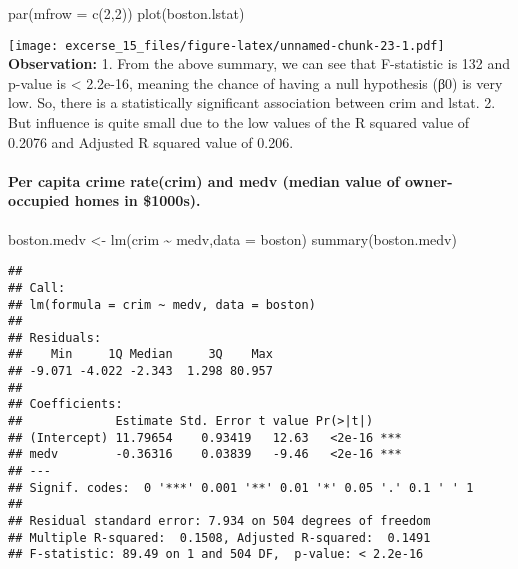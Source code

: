 \documentclass[
]{article}
\newenvironment{Shaded}{\begin{snugshade}}{\end{snugshade}}
\newcommand{\AttributeTok}[1]{\textcolor[rgb]{0.77,0.63,0.00}{#1}}
\newcommand{\DecValTok}[1]{\textcolor[rgb]{0.00,0.00,0.81}{#1}}
\newcommand{\FunctionTok}[1]{\textcolor[rgb]{0.00,0.00,0.00}{#1}}
\newcommand{\NormalTok}[1]{#1}
\newcommand{\OtherTok}[1]{\textcolor[rgb]{0.56,0.35,0.01}{#1}}
\newcommand{\SpecialCharTok}[1]{\textcolor[rgb]{0.00,0.00,0.00}{#1}}
\begin{document}
\begin{Shaded}
\begin{Highlighting}[]
\FunctionTok{par}\NormalTok{(}\AttributeTok{mfrow =} \FunctionTok{c}\NormalTok{(}\DecValTok{2}\NormalTok{,}\DecValTok{2}\NormalTok{))}
\FunctionTok{plot}\NormalTok{(boston.lstat)}
\end{Highlighting}
\end{Shaded}

\texttt{[image: excerse\_15\_files/figure-latex/unnamed-chunk-23-1.pdf]}
\textbf{Observation:} 1. From the above summary, we can see that
F-statistic is 132 and p-value is \textless{} 2.2e-16, meaning the
chance of having a null hypothesis (β0) is very low. So, there is a
statistically significant association between crim and lstat. 2. But
influence is quite small due to the low values of the R squared value of
0.2076 and Adjusted R squared value of 0.206.

\hypertarget{per-capita-crime-ratecrim-and-medv-median-value-of-owner-occupied-homes-in-1000s.}{%
\paragraph{Per capita crime rate(crim) and medv (median value of
owner-occupied homes in
\$1000s).}\label{per-capita-crime-ratecrim-and-medv-median-value-of-owner-occupied-homes-in-1000s.}}

\begin{Shaded}
\begin{Highlighting}[]
\NormalTok{boston.medv }\OtherTok{\textless{}{-}} \FunctionTok{lm}\NormalTok{(crim }\SpecialCharTok{\textasciitilde{}}\NormalTok{ medv,}\AttributeTok{data =}\NormalTok{ boston)}
\FunctionTok{summary}\NormalTok{(boston.medv)}
\end{Highlighting}
\end{Shaded}

\begin{verbatim}
## 
## Call:
## lm(formula = crim ~ medv, data = boston)
## 
## Residuals:
##    Min     1Q Median     3Q    Max 
## -9.071 -4.022 -2.343  1.298 80.957 
## 
## Coefficients:
##             Estimate Std. Error t value Pr(>|t|)    
## (Intercept) 11.79654    0.93419   12.63   <2e-16 ***
## medv        -0.36316    0.03839   -9.46   <2e-16 ***
## ---
## Signif. codes:  0 '***' 0.001 '**' 0.01 '*' 0.05 '.' 0.1 ' ' 1
## 
## Residual standard error: 7.934 on 504 degrees of freedom
## Multiple R-squared:  0.1508, Adjusted R-squared:  0.1491 
## F-statistic: 89.49 on 1 and 504 DF,  p-value: < 2.2e-16
\end{verbatim}
\end{document}
